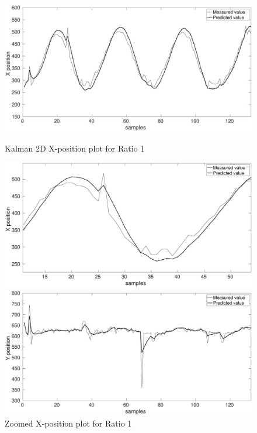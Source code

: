 \documentclass[12pt]{article}
\begin{document}
\begin{figure}[h]
\centering
\begin{minipage}{0.5\textwidth}
\centering
	\includegraphics[width = \textwidth]{./Figures/part2Ratio1X.eps}
	\caption{Kalman 2D X-position plot for Ratio 1}
	\label{fig:kalman 2D XRat1}
\end{minipage}%
\begin{minipage}{0.5\textwidth}
\centering
	\includegraphics[width = \textwidth]{./Figures/part2Ratio1Xzoomed.eps}
	\caption{ Zoomed X-position plot for Ratio 1}
	\label{fig: kalman 2D XRat1 zoom}
\end{minipage}
\begin{minipage}{0.5\textwidth}
\centering
	\includegraphics[width = \textwidth]{./Figures/part2Ratio1Y.eps}

\end{minipage}
\end{figure}
\end{document}
